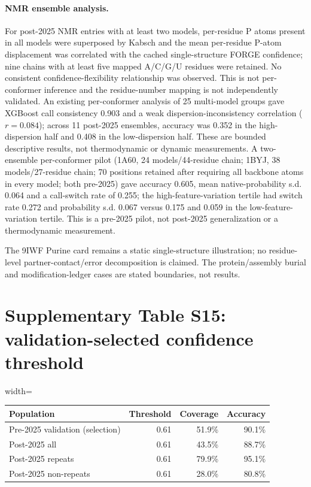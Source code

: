 \documentclass[pdflatex,sn-nature]{sn-jnl}
\begin{document}
\paragraph{NMR ensemble analysis.} For post-2025 NMR entries with at least two models,
per-residue P atoms present in all models were superposed by Kabsch and the mean
per-residue P-atom displacement was correlated with the cached single-structure FORGE
confidence; nine chains with at least five mapped A/C/G/U residues were retained. No
consistent confidence-flexibility relationship was observed. This is not per-conformer
inference and the residue-number mapping is not independently validated. An existing
per-conformer analysis of 25 multi-model groups gave XGBoost call consistency 0.903 and a
weak dispersion-inconsistency correlation ($r=0.084$); across 11 post-2025 ensembles,
accuracy was 0.352 in the high-dispersion half and 0.408 in the low-dispersion half. These are bounded descriptive results, not thermodynamic or dynamic measurements. A
two-ensemble per-conformer pilot (1A60, 24 models/44-residue chain; 1BYJ, 38
models/27-residue chain; 70 positions retained after requiring all backbone atoms in every
model; both pre-2025) gave accuracy 0.605, mean native-probability
s.d. 0.064 and a call-switch rate of 0.255; the high-feature-variation tertile had switch rate
0.272 and probability s.d. 0.067 versus 0.175 and 0.059 in the low-feature-variation tertile.
This is a pre-2025 pilot, not post-2025 generalization or a thermodynamic measurement.

The 9IWF Purine card remains a static single-structure illustration; no residue-level
partner-contact/error decomposition is claimed. The protein/assembly burial and
modification-ledger cases are stated boundaries, not results.

\section*{Supplementary Table S15: validation-selected confidence threshold}

\begingroup\scriptsize
\begin{adjustbox}{width=\textwidth}
\begin{tabular}{lrrr}
\toprule
Population & Threshold & Coverage & Accuracy \\
\midrule
Pre-2025 validation (selection) & 0.61 & 51.9\% & 90.1\% \\
Post-2025 all & 0.61 & 43.5\% & 88.7\% \\
Post-2025 repeats & 0.61 & 79.9\% & 95.1\% \\
Post-2025 non-repeats & 0.61 & 28.0\% & 80.8\% \\
\bottomrule
\end{tabular}
\end{adjustbox}
\endgroup
\end{document}
